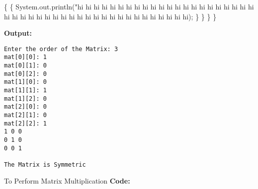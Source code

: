 \documentclass[
  12pt,
]{article}
\newenvironment{Shaded}{}{}
\newcommand{\BuiltInTok}[1]{\textcolor[rgb]{0.00,0.50,0.00}{#1}}
\newcommand{\FunctionTok}[1]{\textcolor[rgb]{0.02,0.16,0.49}{#1}}
\newcommand{\OperatorTok}[1]{\textcolor[rgb]{0.40,0.40,0.40}{#1}}
\newcommand{\StringTok}[1]{\textcolor[rgb]{0.25,0.44,0.63}{#1}}
\begin{document}
\begin{Shaded}
\begin{Highlighting}[numbers=left,,]
            \OperatorTok{\{}
                \OperatorTok{\{}
                    \BuiltInTok{System}\OperatorTok{.}\FunctionTok{out}\OperatorTok{.}\FunctionTok{println}\OperatorTok{(}\StringTok{"hi hi hi hi hi hi hi hi hi hi hi hi hi hi hi hi hi hi hi hi hi hi hi hi hi hi hi hi hi hi hi hi hi hi hi hi hi hi hi hi hi hi hi hi hi);}
                \OperatorTok{\}}
            \OperatorTok{\}}
        \OperatorTok{\}}
    \OperatorTok{\}}
\end{Highlighting}
\end{Shaded}

\textbf{Output:}

\begin{verbatim}
Enter the order of the Matrix: 3
mat[0][0]: 1
mat[0][1]: 0
mat[0][2]: 0
mat[1][0]: 0
mat[1][1]: 1
mat[1][2]: 0
mat[2][0]: 0
mat[2][1]: 0
mat[2][2]: 1
1 0 0 
0 1 0
0 0 1

The Matrix is Symmetric
\end{verbatim}

To Perform Matrix Multiplication \textbf{Code:}
\end{document}
